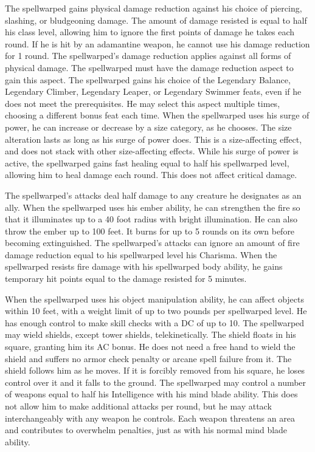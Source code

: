  The spellwarped gains physical damage reduction against his choice of piercing, slashing, or bludgeoning damage. The amount of damage resisted is equal to half his class level, allowing him to ignore the first points of damage he takes each round. If he is hit by an adamantine weapon, he cannot use his damage reduction for 1 round.
 The spellwarped's damage reduction applies against all forms of physical damage. The spellwarped must have the damage reduction aspect to gain this aspect.
 The spellwarped gains his choice of the Legendary Balance, Legendary Climber, Legendary Leaper, or Legendary Swimmer feats, even if he does not meet the prerequisites. He may select this aspect multiple times, choosing a different bonus feat each time.
 When the spellwarped uses his surge of power, he can increase or decrease by a size category, as he chooses. The size alteration lasts as long as his surge of power does. This is a size-affecting effect, and does not stack with other size-affecting effects.
 While his surge of power is active, the spellwarped gains fast healing equal to half his spellwarped level, allowing him to heal damage each round. This does not affect critical damage.

 The spellwarped's attacks deal half damage to any creature he designates as an ally.
 When the spellwarped uses his ember ability, he can strengthen the fire so that it illuminates up to a 40 foot radius with bright illumination. He can also throw the ember up to 100 feet. It burns for up to 5 rounds on its own before becoming extinguished.
 The spellwarped's attacks can ignore an amount of fire damage reduction equal to his spellwarped level \add his Charisma.
 When the spellwarped resists fire damage with his spellwarped body ability, he gains temporary hit points equal to the damage resisted for 5 minutes.

 When the spellwarped uses his object manipulation ability, he can affect objects within 10 feet, with a weight limit of up to two pounds per spellwarped level. He has enough control to make skill checks with a DC of up to 10.
 The spellwarped may wield shields, except tower shields, telekinetically. The shield floats in his square, granting him its AC bonus. He does not need a free hand to wield the shield and suffers no armor check penalty or arcane spell failure from it. The shield follows him as he moves. If it is forcibly removed from his square, he loses control over it and it falls to the ground.
 The spellwarped may control a number of weapons equal to half his Intelligence with his mind blade ability. This does not allow him to make additional attacks per round, but he may attack interchangeably with any weapon he controls. Each weapon threatens an area and contributes to overwhelm penalties, just as with his normal mind blade ability.

